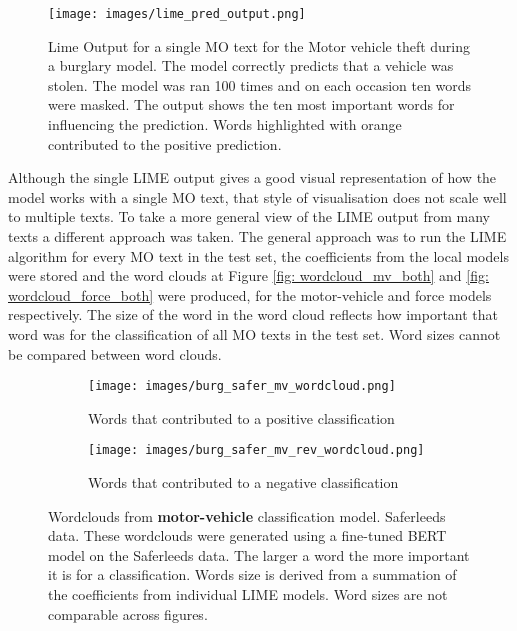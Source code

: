 \begin{figure}[!tbp]
  \centering
    \texttt{[image: images/lime\_pred\_output.png]}
    \caption[Lime Output for a single MO text for the Motor vehicle theft during a burglary model.]{ Lime Output for a single MO text for the Motor vehicle theft during a burglary model. The model correctly predicts that a vehicle was stolen. The model was ran 100 times and on each occasion ten words were masked. The output shows the ten most important words for influencing the prediction. Words highlighted with orange contributed to the positive prediction.}
    \label{fig:lime_out1}
\end{figure}



Although the single LIME output gives a good visual representation of how the model works with a single MO text, that style of visualisation does not scale well to multiple texts. To take a more general view of the LIME output from many texts a different approach was taken.   The general approach was to run the LIME algorithm for every MO text in the test set, the coefficients from the local models were stored and the word clouds at Figure \ref{fig: wordcloud_mv_both}  and \ref{fig: wordcloud_force_both} were produced, for the motor-vehicle and force models respectively. The size of the word in the word cloud reflects how important that word was for the classification of all MO texts in the test set. Word sizes cannot be compared between word clouds.  


\begin{figure}
     \centering
     \begin{subfigure}[b]{0.9\textwidth}
         \centering
         \texttt{[image: images/burg\_safer\_mv\_wordcloud.png]}
         \caption{Words that contributed to a positive classification}
         \label{fig: wordcloud_mv}
     \end{subfigure}
     \vfill
     \begin{subfigure}[b]{0.9\textwidth}
         \centering
         \texttt{[image: images/burg\_safer\_mv\_rev\_wordcloud.png]}
         \caption{Words that contributed to a negative classification}
         \label{fig: wordcloud_mv_rev}
     \end{subfigure}
        \caption[Wordclouds from  \textbf{motor-vehicle} classification model. Saferleeds data.]{Wordclouds from  \textbf{motor-vehicle} classification model. Saferleeds data. These wordclouds were generated using a fine-tuned BERT model on the Saferleeds data. The larger a word the more important it is for a classification. Words size is derived from a summation of the coefficients from individual LIME models. Word sizes are not comparable across figures.}
        \label{fig:wordcloud_mv_both}
        
\end{figure}


